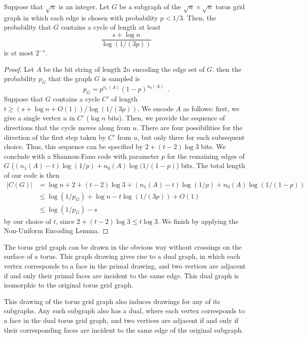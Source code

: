 \documentclass[format=acmsmall, review=false, screen=true]{acmart}
\begin{document}
\begin{thm}
  Suppose that $\sqrt{n}$ is an integer.  Let $G$ be a subgraph of the
  $\sqrt{n} \times \sqrt{n}$ torus grid graph in which each edge is
  chosen with probability $p < 1/3$. Then, the probability that $G$
  contains a cycle of length at least
  \[
    \frac{s + \log n}{\log (1/(3p))}
  \]
  is at most $2^{-s}$.
\end{thm}
\begin{proof}
  Let $A$ be the bit string of length $2n$ encoding the edge set of
  $G$. then the probability $p_G$ that the graph $G$ is sampled is
  \[
     p_G  = p^{n_1(A)}(1-p)^{n_0(A)} \enspace .
  \]
  Suppose that $G$ contains a cycle $C'$ of length
  $t \geq (s + \log n + O(1))/\log (1/(3p))$. We encode $A$ as follows:
  first, we give a single vertex $u$ in $C'$ ($\log n$ bits). Then,
  we provide the sequence of directions that the cycle
  moves along from $u$. 
  There are four possibilities for the direction of the
  first step taken by $C'$ from $u$, but only three for each
  subsequent choice. Thus, this sequence can be specified by
  $2 + (t - 2) \log 3$ bits.
  We conclude with a Shannon-Fano code with parameter $p$ for
  the remaining edges of $G$ ($(n_1(A) - t) 
  \log (1/p) + n_0(A) \log (1/(1 - p)$)
  bits. The total length of our code is then
  \begin{align*}
    |C(G)| &= \log n + 2 + (t - 2) \log 3 + (n_1(A) - t) \log (1/p) +
             n_0(A) \log (1/(1 - p)) \\
           &\leq \log (1/p_G) + \log n - t \log (1/(3p)) + O(1) \\
           &\leq \log (1/p_G) - s
  \end{align*}
  by our choice of $t$, since $2 +  (t-2) \log 3 \leq t\log 3$.
  We finish by applying the Non-Uniform Encoding
  Lemma.
\end{proof}

The torus grid graph can be drawn in the obvious way without crossings
on the surface of a torus. This graph drawing gives rise to a dual
graph, in which each vertex corresponds to a face in the primal
drawing, and two vertices are adjacent if and only their primal faces
are incident to the same edge. This dual graph is isomorphic to the
original torus grid graph.

This drawing of the torus grid graph also induces drawings for
any of its subgraphs. Any such subgraph also has a dual, where each
vertex corresponds to a face in the dual torus grid graph, and two
vertices are adjacent if and only if their corresponding faces are
incident to the same edge of the original subgraph.
\end{document}
